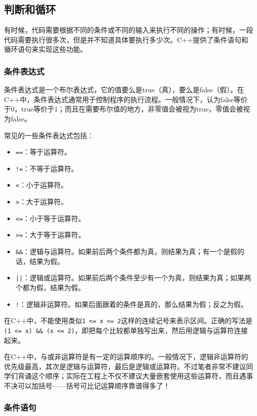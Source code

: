 \subsection{判断和循环}
有时候，代码需要根据不同的条件或不同的输入来执行不同的操作；有时候，一段代码需要执行很多次，但是并不知道具体要执行多少次。C++提供了条件语句和循环语句来实现这些功能。

\subsubsection{条件表达式}
条件表达式是一个布尔表达式，它的值要么是true（真），要么是false（假）。在C++中，条件表达式通常用于控制程序的执行流程。一般情况下，认为false等价于0，true等价于1；而且在需要布尔值的地方，非零值会被视为true，零值会被视为false。

常见的一些条件表达式包括：
\begin{itemize}
  \item \texttt{==}：等于运算符。
  \item \texttt{!=}：不等于运算符。
  \item \texttt{<}：小于运算符。
  \item \texttt{>}：大于运算符。
  \item \texttt{<=}：小于等于运算符。
  \item \texttt{>=}：大于等于运算符。
  \item \texttt{\&\&}：逻辑与运算符。如果前后两个条件都为真，则结果为真；有一个是假的话，结果为假。
  \item \texttt{||}：逻辑或运算符。如果前后两个条件至少有一个为真，则结果为真；如果两个都为假，结果为假。
  \item \texttt{!}：逻辑非运算符。如果后面跟着的条件是真的，那么结果为假；反之为假。
\end{itemize}

\begin{tip}
    在C++中，不能使用类似\texttt{1 <= x <= 2}这样的连续记号来表示区间。正确的写法是\texttt{(1 <= x) \&\& (x <= 2)}，即把每个比较都单独写出来，然后用逻辑与运算符连接起来。
\end{tip}

在C++中，与或非运算符是有一定的运算顺序的。一般情况下，逻辑非运算符的优先级最高，其次是逻辑与运算符，最后是逻辑或运算符。不过笔者非常不建议同学们背诵这个顺序；实际在工程上不仅不建议大量嵌套使用这些运算符，而且遇事不决可以加括号——括号可比记运算顺序靠谱得多了！

\subsubsection{条件语句}

